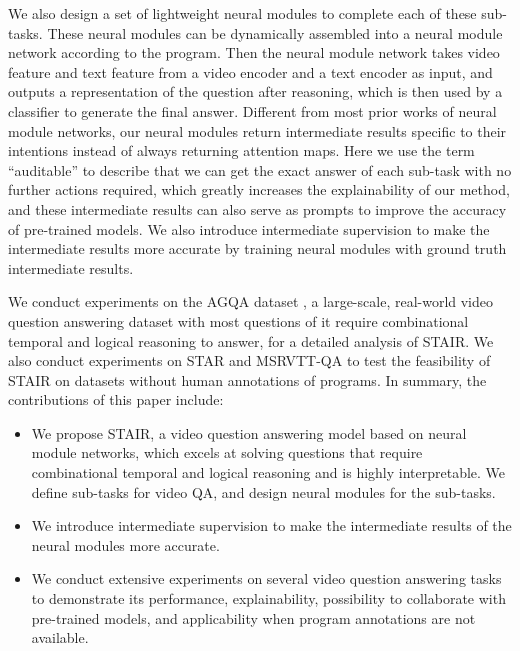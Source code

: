 \documentclass[letterpaper]{article} %
\begin{document}
We also design a set of lightweight neural modules to complete each of these sub-tasks. These neural modules can be dynamically assembled into a neural module network according to the program. Then the neural module network takes video feature and text feature from a video encoder and a text encoder as input, and outputs a representation of the question after reasoning, which is then used by a classifier to generate the final answer. Different from most prior works of neural module networks, our neural modules return intermediate results specific to their intentions instead of always returning attention maps. Here we use the term ``auditable'' to describe that we can get the exact answer of each sub-task with no further actions required, which greatly increases the explainability of our method, and these intermediate results can also serve as prompts to improve the accuracy of pre-trained models.
We also introduce intermediate supervision to make the intermediate results more accurate by training neural modules with ground truth intermediate results.

We conduct experiments on the AGQA dataset \cite{GrundeMcLaughlin2021AGQA, GrundeMcLaughlin2022AGQA2}, a large-scale, real-world video question answering dataset with most questions of it require combinational temporal and logical reasoning to answer, for a detailed analysis of STAIR.
We also conduct experiments on STAR \cite{Wu2021STAR} and MSRVTT-QA \cite{Gao2018MotionAppearanceCN} to test the feasibility of STAIR on datasets without human annotations of programs. In summary, the contributions of this paper include:

\begin{itemize}
    \item We propose STAIR, a video question answering model based on neural module networks, which excels at solving questions that require combinational temporal and logical reasoning and is highly interpretable. We define sub-tasks for video QA, and design neural modules for the sub-tasks.
    \item We introduce intermediate supervision to make the intermediate results of the neural modules more accurate.
    \item We conduct extensive experiments on several video question answering tasks to demonstrate its performance, explainability, possibility to collaborate with pre-trained models, and applicability when program annotations are not available.
\end{itemize}
\end{document}
